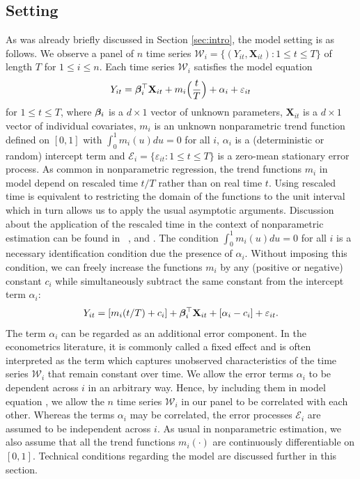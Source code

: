 \documentclass[a4paper,12pt]{article}
\makeatletter
\renewcommand{\eqref}[1]{\tagform@{\ref{#1}}}
\makeatother
\begin{document}
\subsection{Setting}\label{subsec:model_setting}

As was already briefly discussed in Section \ref{sec:intro}, the model setting is as follows. We observe a panel of $n$ time series $\mathcal{W}_i = \{(Y_{it}, \mathbf{X}_{it}): 1 \le t \le T \}$ of length $T$ for $1 \le i \le n$. Each time series $\mathcal{W}_i$ satisfies the model equation 
\begin{equation}\label{eq:model_full}
Y_{it} = \bm{\beta}^\top_i \mathbf{X}_{it} + m_i \Big( \frac{t}{T} \Big) + \alpha_i + \varepsilon_{it} 
\end{equation}
for $1 \le t \le T$, where $\bm{\beta}_i$ is a $d \times 1$ vector of unknown parameters, $\mathbf{X}_{it}$ is a $d\times 1$ vector of individual covariates, $m_i$ is an unknown nonparametric trend function defined on $[0,1]$ with $\int_0^1 m_i(u) du = 0$ for all $i$, $\alpha_i$ is a (deterministic or random) intercept term and \linebreak $\mathcal{E}_i = \{ \varepsilon_{it}: 1 \le t \le T \}$ is a zero-mean stationary error process. As common in nonparametric regression, the trend functions $m_i$ in model \eqref{eq:model_full} depend on rescaled time $t/T$ rather than on real time $t$. Using rescaled time is equivalent to restricting the domain of the functions to the unit interval which in turn allows us to apply the usual asymptotic arguments. Discussion about the application of the rescaled time in the context of nonparametric estimation can be found in \ \cite{Robinson1989}, \cite{Dahlhaus1997} and \cite{VogtLinton2014}. The condition $\int_0^1 m_i(u) du = 0$ for all $i$ is a necessary identification condition due the presence of  $\alpha_i$. Without imposing this condition, we can freely increase the functions $m_i$ by any (positive or negative) constant $c_i$ while simultaneously subtract the same constant from the intercept term $\alpha_i$:
$$Y_{it} = [m_i(t/T) + c_i] + \bm{\beta}_i^\top \mathbf{X}_{it} + [\alpha_i - c_i] + \varepsilon_{it}.$$
The term $\alpha_i$ can be regarded as an additional error component. In the econometrics literature, it is commonly called a fixed effect and is often interpreted as the term which captures unobserved characteristics of the time series $\mathcal{W}_i$ that remain constant over time. We allow the error terms $\alpha_i$ to be dependent across $i$ in an arbitrary way. Hence, by including them in model equation \eqref{eq:model_full}, we allow the $n$ time series $\mathcal{W}_i$ in our panel to be correlated with each other. Whereas the terms $\alpha_i$ may be correlated, the error processes $\mathcal{E}_i$ are assumed to be independent across $i$. As usual in nonparametric estimation, we also assume that all the trend functions $m_i(\cdot)$ are continuously differentiable on $[0, 1]$. Technical conditions regarding the model are discussed further in this section.
\end{document}
